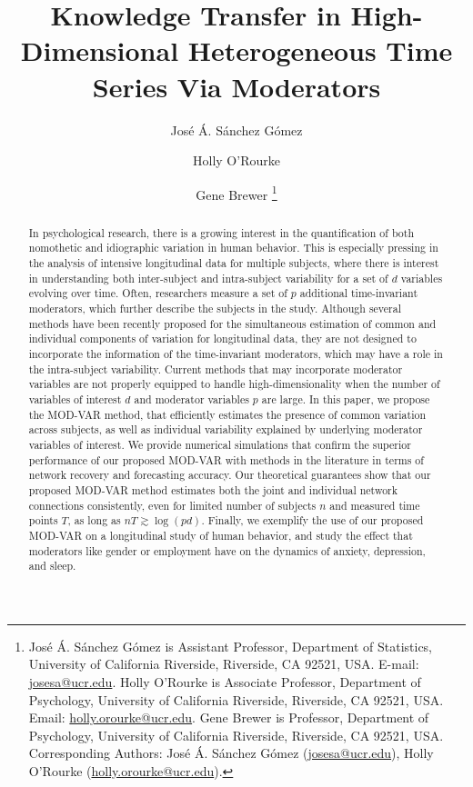 \documentclass[12pt]{article}
\begin{document}
\def\spacingset#1{\renewcommand{\baselinestretch}
{#1}\small\normalsize} \spacingset{1}



{
	\title{\bf Knowledge Transfer in High-Dimensional Heterogeneous Time Series Via Moderators}
	\author{
		José Á. Sánchez Gómez \and  Holly O'Rourke \and  Gene Brewer \thanks{ José Á. Sánchez Gómez is Assistant Professor, Department of Statistics, University of California Riverside, Riverside, CA 92521, USA. E-mail: \href{mailto:josesa@ucr.edu}{josesa@ucr.edu}. Holly O'Rourke is Associate Professor, Department of Psychology, University of California Riverside, Riverside, CA 92521, USA. Email: \href{mailto:holly.orourke@ucr.edu}{holly.orourke@ucr.edu}. Gene Brewer is Professor, Department of Psychology, University of California Riverside, Riverside, CA 92521, USA.\\
		Corresponding Authors: José Á. Sánchez Gómez (\href{mailto:josesa@ucr.edu}{josesa@ucr.edu}), Holly O'Rourke (\href{mailto:holly.orourke@ucr.edu}{holly.orourke@ucr.edu}).}
	}
	\date{}
	\maketitle
}


\bigskip
\begin{abstract}
	In psychological research, there is a growing interest in the quantification of both nomothetic and idiographic variation in human behavior. This is especially pressing in the analysis of intensive longitudinal data for multiple subjects, where there is interest in understanding both inter-subject and intra-subject variability for a set of $d$ variables evolving over time. Often, researchers measure a set of $p$ additional time-invariant moderators, which further describe the subjects in the study.  Although several methods have been recently proposed for the simultaneous estimation of common and individual components of variation for longitudinal data, they are not designed to incorporate the information of the time-invariant moderators, which may have a role in the intra-subject variability. Current methods that may incorporate moderator variables are not properly equipped to handle high-dimensionality when the number of variables of interest $d$ and moderator variables $p$ are large. In this paper, we propose the MOD-VAR method, that efficiently estimates the presence of common variation across subjects, as well as individual variability explained by underlying moderator variables of interest. We provide numerical simulations that confirm the superior performance of our proposed MOD-VAR with methods in the literature in terms of network recovery and forecasting accuracy. Our theoretical guarantees show that our proposed MOD-VAR method estimates both the joint and individual network connections consistently, even for limited number of subjects $n$ and measured time points $T$, as long as $ nT \gtrsim \log(pd)$. Finally, we exemplify the use of our proposed MOD-VAR on a longitudinal study of human behavior, and study the effect that moderators like gender or employment have on the dynamics of anxiety, depression, and sleep. 
\end{abstract}
\end{document}
